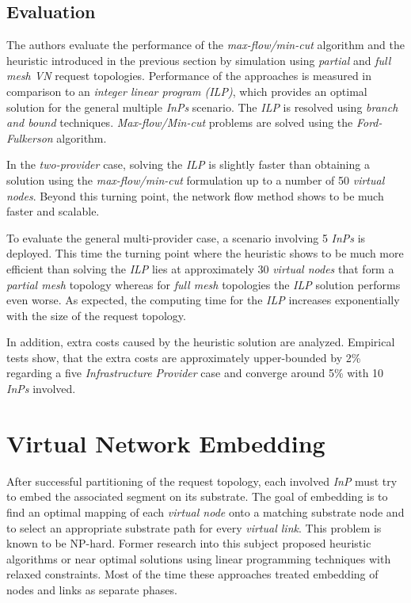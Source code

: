 \documentclass[prodmode,acmtomccap]{acmlarge}
\begin{document}
\subsection{Evaluation}
The authors evaluate the performance of the \emph{max-flow/min-cut} algorithm and the heuristic introduced in the previous section
by simulation using \emph{partial} and \emph{full mesh VN} request topologies. 
Performance of the approaches is measured in comparison to an \emph{integer linear program (ILP)}, which provides an optimal solution for the general multiple \emph{InPs} scenario.
The \emph{ILP} is resolved using \emph{branch and bound} techniques. \emph{Max-flow/Min-cut} problems are solved using the \emph{Ford-Fulkerson} algorithm.

In the \emph{two-provider} case, solving the \emph{ILP} is slightly faster than obtaining a solution using the \emph{max-flow/min-cut} formulation up to a number of
50 \emph{virtual nodes}. Beyond this turning point, the network flow method shows to be much faster and scalable.

To evaluate the general multi-provider case, a scenario involving 5 \emph{InPs} is deployed. This time the turning point where the heuristic shows to be much more efficient than solving the \emph{ILP}
lies at approximately 30 \emph{virtual nodes} that form a \emph{partial mesh} topology whereas for \emph{full mesh} topologies the \emph{ILP} solution performs even worse.
As expected, the computing time for the \emph{ILP} increases exponentially with the size of the request topology.

In addition, extra costs caused by the heuristic solution are analyzed. Empirical tests show, that the extra costs are approximately upper-bounded by 2\% regarding a five \emph{Infrastructure Provider} case and
converge around 5\% with 10 \emph{InPs} involved.

\section{Virtual Network Embedding}
\label{sec:embedding}
After successful partitioning of the request topology, each involved \emph{InP} must try to embed the associated segment on its substrate.
The goal of embedding is to find an optimal mapping of each \emph{virtual node} onto a matching substrate node and to select an appropriate substrate path for every \emph{virtual link}.
This problem is known to be NP-hard. Former research into this subject proposed heuristic algorithms or near optimal solutions using linear programming techniques with
relaxed constraints. Most of the time these approaches treated embedding of nodes and links as separate phases.
\end{document}
